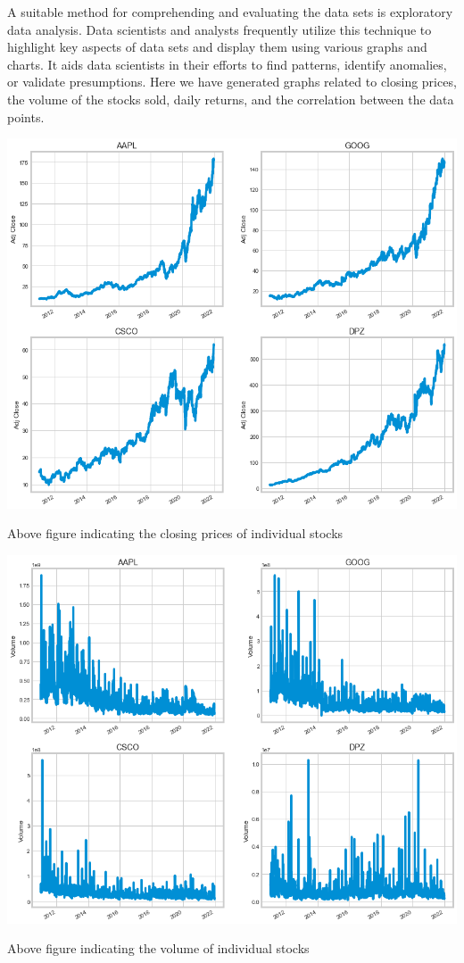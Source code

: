 A suitable method for comprehending and evaluating the data sets is exploratory data analysis. Data scientists and analysts frequently utilize this technique to highlight key aspects of data sets and display them using various graphs and charts. It aids data scientists in their efforts to find patterns, identify anomalies, or validate presumptions. Here we have generated graphs related to closing prices, the volume of the stocks sold, daily returns, and the correlation between the data points.

\begin{center}
    \includegraphics[scale=0.40]{close_prices.png}
    \caption{ Above figure indicating the closing prices of individual stocks}
\end{center}

\begin{center}
    \includegraphics[scale=0.40]{volume_info.png}
    \caption{ Above figure indicating the volume of individual stocks}
\end{center}


